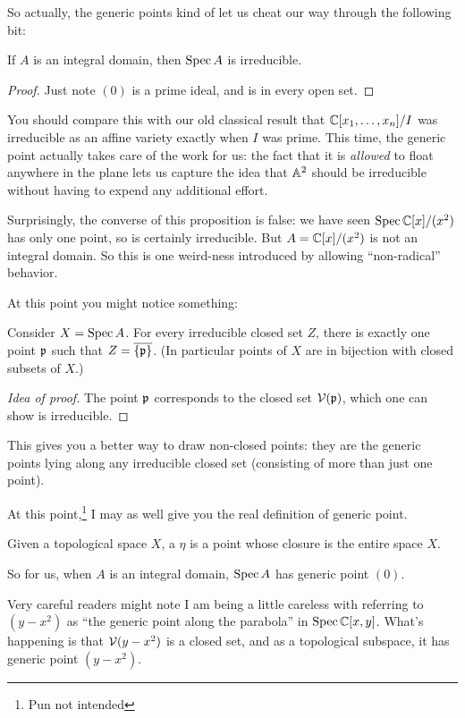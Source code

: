 So actually, the generic points
kind of let us cheat our way through the following bit:
\begin{proposition}
	If $A$ is an integral domain, then $\operatorname{Spec} A$ is irreducible.
\end{proposition}
\begin{proof}
	Just note $(0)$ is a prime ideal, and is in every open set.
\end{proof}
You should compare this with our old classical result that
$\mathbb C[x_1, \dots, x_n]/I$
was irreducible as an affine variety exactly when $I$ was prime.
This time, the generic point actually takes care of the work for us:
the fact that it is \emph{allowed} to float
anywhere in the plane lets us capture the idea that
$\mathbb A^2$ should be irreducible
without having to expend any additional effort.
\begin{remark}
	Surprisingly, the converse of this proposition is false:
	we have seen $\operatorname{Spec} \mathbb C[x]/(x^2)$ has only one point,
	so is certainly irreducible.
	But $A = \mathbb C[x]/(x^2)$ is not an integral domain.
	So this is one weird-ness introduced by allowing ``non-radical'' behavior.
\end{remark}

At this point you might notice something:
\begin{theorem}
	Consider $X = \operatorname{Spec} A$.
	For every irreducible closed set $Z$,
	there is exactly one point $\mathfrak p$ such that $Z = \overline{\{\mathfrak p\}}$.
	(In particular points of $X$ are in bijection
	with closed subsets of $X$.)
\end{theorem}
\begin{proof}
	[Idea of proof]
	The point $\mathfrak p$ corresponds to the closed set $\mathcal V(\mathfrak p)$,
	which one can show is irreducible.
\end{proof}
This gives you a better way to draw non-closed points:
they are the generic points lying along any irreducible closed set
(consisting of more than just one point).

At this point,\footnote{Pun not intended}
I may as well give you the real definition of generic point.
\begin{definition}
	Given a topological space $X$, a  $\eta$
	is a point whose closure is the entire space $X$.
\end{definition}
So for us, when $A$ is an integral domain,
$\operatorname{Spec} A$ has generic point $(0)$.
\begin{abuse}
	Very careful readers might note I am being a little careless
	with referring to $(y-x^2)$ as
	``the generic point along the parabola''
	in $\operatorname{Spec} \mathbb C[x,y]$.
	What's happening is that $\mathcal V(y-x^2)$ is a closed set,
	and as a topological subspace, it has generic point $(y-x^2)$.
\end{abuse}

